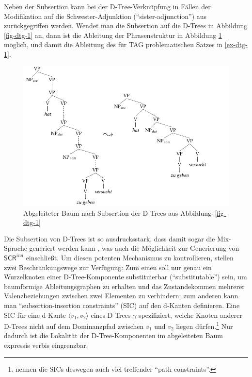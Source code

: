 Neben der Subsertion kann bei der D-Tree-Verknüpfung in Fällen der Modifikation auf die Schwester-Adjunktion ("`sister-adjunction"') aus \cite{Schabes:Shieber:94} zurückgegriffen werden. Wendet man die Subsertion auf die D-Trees in Abbildung \ref{fig-dtg-1} an, dann ist die Ableitung der Phrasenstruktur in Abbildung \ref{fig-dtg-2} möglich, und damit die Ableitung des für TAG problematischen Satzes in \ref{ex-dtg-1}.
\begin{figure}[t]
\centering
\includegraphics{graphics/abb610.pdf}
\caption{\label{fig-dtg-2}Abgeleiteter Baum nach Subsertion der D-Trees aus Abbildung~\ref{fig-dtg-1}}
\end{figure}

Die Subsertion von D-Trees ist so ausdrucksstark, dass damit sogar die Mix-Sprache generiert werden kann \citep[Abb.~13]{Rambow:etal:01}, was auch die Möglichkeit zur Generierung von $\mathsf{SCR}^{ind}$ einschlie\ss t. Um diesen potenten Mechanismus zu kontrollieren, stellen \cite{Rambow:etal:95} zwei Beschränkungswege zur Verfügung: Zum einen soll nur genau ein Wurzelknoten einer D-Tree-Komponente substituierbar ("`substitutable"') sein, um baumförmige Ableitungsgraphen zu erhalten und das Zustandekommen mehrerer Valenzbeziehungen zwischen zwei Elementen zu verhindern; zum anderen kann man "`subsertion-insertion constraints"' (SIC) auf den d-Kanten definieren. Eine SIC für eine d-Kante $\langle v_1,v_2 \rangle$ eines D-Trees $\gamma$ spezifiziert, welche Knoten anderer D-Trees nicht auf dem Dominanzpfad zwischen $v_1$ und $v_2$ liegen dürfen.\footnote{\cite{Rambow:etal:01} nennen die SICs deswegen auch viel treffender "`path constraints"'.} Nur dadurch ist die Lokalität der D-Tree-Komponenten im abgeleiteten Baum expressis verbis eingrenzbar.

